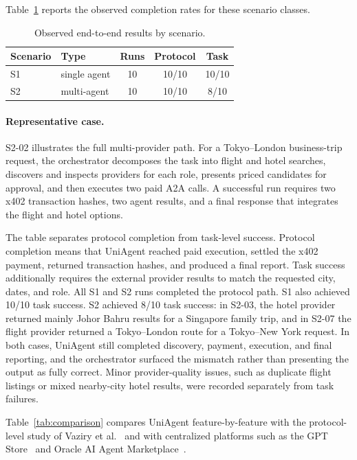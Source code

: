 \documentclass[sigconf]{acmart}
\begin{document}
Table~\ref{tab:scenarios} reports the observed completion rates for
these scenario classes.

\begin{table}[H]
  \centering
  \caption{Observed end-to-end results by scenario.}
  \label{tab:scenarios}
  \small
  \begin{tabular}{@{}llccc@{}}
    \toprule
    Scenario & Type & Runs & Protocol & Task \\
    \midrule
    S1 & single agent & 10 & 10/10 & 10/10 \\
    S2 & multi-agent  & 10 & 10/10 & 8/10 \\
    \bottomrule
  \end{tabular}
\end{table}

\paragraph{Representative case.}
S2-02 illustrates the full multi-provider path. For a Tokyo--London
business-trip request, the orchestrator decomposes the task into flight
and hotel searches, discovers and inspects providers for each role,
presents priced candidates for approval, and then executes two paid A2A
calls. A successful run requires two x402 transaction hashes, two agent
results, and a final response that integrates the flight and hotel
options.

The table separates protocol completion from task-level
success. Protocol completion means that UniAgent reached paid execution,
settled the x402 payment, returned transaction hashes, and produced a
final report. Task success additionally requires the external provider
results to match the requested city, dates, and role. All S1 and S2 runs
completed the protocol path. S1 also achieved 10/10 task success. S2
achieved 8/10 task success: in S2-03, the hotel provider returned mainly
Johor Bahru results for a Singapore family trip, and in S2-07 the flight
provider returned a Tokyo--London route for a Tokyo--New York request.
In both cases, UniAgent still completed discovery, payment, execution,
and final reporting, and the orchestrator surfaced the mismatch rather
than presenting the output as fully correct. Minor provider-quality
issues, such as duplicate flight listings or mixed nearby-city hotel
results, were recorded separately from task failures.

Table~\ref{tab:comparison} compares UniAgent feature-by-feature with the
protocol-level study of Vaziry et al.~\cite{vaziry2025} and with
centralized platforms such as the GPT Store~\cite{gptstore} and Oracle
AI Agent Marketplace~\cite{oracleAgentMarketplace2025}.
\end{document}
